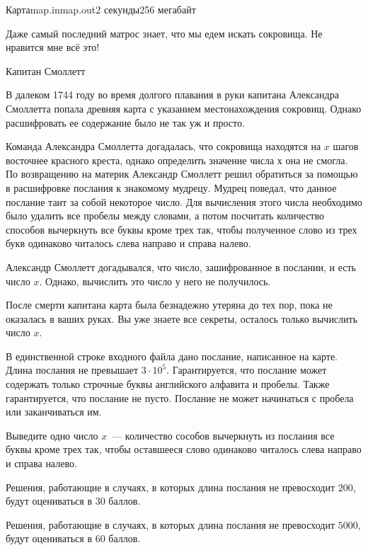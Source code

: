 \begin{problem}{Карта}{map.in}{map.out}{2 секунды}{256 мегабайт}


\setlength{\epigraphwidth}{.40\textwidth}
\epigraph{
	Даже самый последний матрос знает, что мы едем искать сокровища. Не нравится мне всё это!
}
{Капитан Смоллетт}


В далеком 1744 году во время долгого плавания в руки капитана 
Александра Смоллетта попала древняя карта с указанием местонахождения 
сокровищ. Однако расшифровать ее содержание было не так уж и просто. 


Команда Александра Смоллетта догадалась, что сокровища находятся на $x$ 
шагов восточнее красного креста, однако определить значение числа $х$
она не смогла. По возвращению на материк Александр Смоллетт решил обратиться 
за помощью в расшифровке послания к знакомому мудрецу. Мудрец поведал,
что данное послание таит за собой некоторое число. Для вычисления этого 
числа необходимо было удалить все пробелы между словами, а потом посчитать 
количество способов вычеркнуть все буквы кроме трех так, чтобы полученное слово 
из трех букв одинаково читалось слева направо и справа налево.

Александр Смоллетт догадывался, что число, зашифрованное в послании, и есть 
число $x$. Однако, вычислить это число у него не получилось.

После смерти капитана карта была безнадежно утеряна до тех пор, пока не оказалась 
в ваших руках. Вы уже знаете все секреты, осталось только вычислить число $x$.
 
\InputFile
В единственной строке входного файла дано послание, написанное на карте. Длина 
послания не превышает $3 \cdot 10^5$. Гарантируется, что послание может содержать только строчные 
буквы английского алфавита и пробелы. Также гарантируется, что послание не пусто. Послание 
не может начинаться с пробела или заканчиваться им.

\OutputFile
Выведите одно число $x$~--- количество сособов вычеркнуть из послания все буквы кроме трех так, 
чтобы оставшееся слово одинаково читалось слева направо и справа налево.

\Examples
\begin{example}%
%
%
\end{example}

\Note
Решения, работающие в случаях, в которых длина послания не превосходит $200$, будут оцениваться в $30$ баллов.

Решения, работающие в случаях, в которых длина послания не превосходит $5000$, будут оцениваться в $60$ баллов.

\end{problem}
